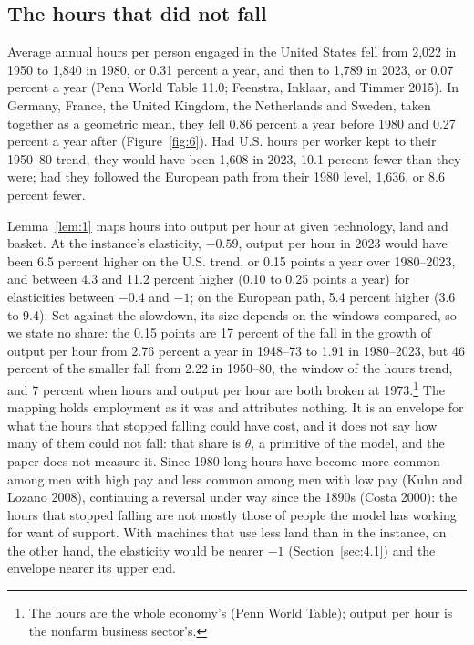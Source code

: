 \documentclass[12pt]{article}
\theoremstyle{plain}
\begin{document}
\subsection{The hours that did not fall}\label{sec:5.4}

Average annual hours per person engaged in the United States fell from 2,022 in 1950 to 1,840 in 1980, or 0.31 percent a year, and then to 1,789 in 2023, or 0.07 percent a year (Penn World Table 11.0; Feenstra, Inklaar, and Timmer 2015). In Germany, France, the United Kingdom, the Netherlands and Sweden, taken together as a geometric mean, they fell 0.86 percent a year before 1980 and 0.27 percent a year after (Figure~\ref{fig:6}). Had U.S. hours per worker kept to their 1950--80 trend, they would have been 1,608 in 2023, 10.1 percent fewer than they were; had they followed the European path from their 1980 level, 1,636, or 8.6 percent fewer.

Lemma~\ref{lem:1} maps hours into output per hour at given technology, land and basket. At the instance's elasticity, $-0.59$, output per hour in 2023 would have been 6.5 percent higher on the U.S. trend, or 0.15 points a year over 1980--2023, and between 4.3 and 11.2 percent higher (0.10 to 0.25 points a year) for elasticities between $-0.4$ and $-1$; on the European path, 5.4 percent higher (3.6 to 9.4). Set against the slowdown, its size depends on the windows compared, so we state no share: the 0.15 points are 17 percent of the fall in the growth of output per hour from 2.76 percent a year in 1948--73 to 1.91 in 1980--2023, but 46 percent of the smaller fall from 2.22 in 1950--80, the window of the hours trend, and 7 percent when hours and output per hour are both broken at 1973.\footnote{The hours are the whole economy's (Penn World Table); output per hour is the nonfarm business sector's.} The mapping holds employment as it was and attributes nothing. It is an envelope for what the hours that stopped falling could have cost, and it does not say how many of them could not fall: that share is $\theta$, a primitive of the model, and the paper does not measure it. Since 1980 long hours have become more common among men with high pay and less common among men with low pay (Kuhn and Lozano 2008), continuing a reversal under way since the 1890s (Costa 2000): the hours that stopped falling are not mostly those of people the model has working for want of support. With machines that use less land than in the instance, on the other hand, the elasticity would be nearer $-1$ (Section~\ref{sec:4.1}) and the envelope nearer its upper end.
\end{document}
